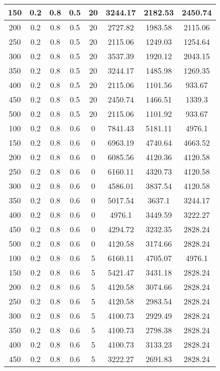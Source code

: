 \documentclass[a4paper, 12pt]{extreport}
\begin{document}
\begin{itemize}
\begin{longtable}{|c|c|c|c|c|c|c|c|}
			150 & 0.2 & 0.8 & 0.5 & 20 & 3244.17 & 2182.53 & 2450.74 \\\hline
			200 & 0.2 & 0.8 & 0.5 & 20 & 2727.82 & 1983.58 & 2115.06 \\\hline
			250 & 0.2 & 0.8 & 0.5 & 20 & 2115.06 & 1249.03 & 1254.64 \\\hline
			300 & 0.2 & 0.8 & 0.5 & 20 & 3537.39 & 1920.12 & 2043.15 \\\hline
			350 & 0.2 & 0.8 & 0.5 & 20 & 3244.17 & 1485.98 & 1269.35 \\\hline
			400 & 0.2 & 0.8 & 0.5 & 20 & 2115.06 & 1101.56 & 933.67 \\\hline
			450 & 0.2 & 0.8 & 0.5 & 20 & 2450.74 & 1466.51 & 1339.3 \\\hline
			500 & 0.2 & 0.8 & 0.5 & 20 & 2115.06 & 1101.92 & 933.67 \\\hline
			100 & 0.2 & 0.8 & 0.6 & 0 & 7841.43 & 5181.11 & 4976.1 \\\hline
			150 & 0.2 & 0.8 & 0.6 & 0 & 6963.19 & 4740.64 & 4663.52 \\\hline
			200 & 0.2 & 0.8 & 0.6 & 0 & 6085.56 & 4120.36 & 4120.58 \\\hline
			250 & 0.2 & 0.8 & 0.6 & 0 & 6160.11 & 4320.73 & 4120.58 \\\hline
			300 & 0.2 & 0.8 & 0.6 & 0 & 4586.01 & 3837.54 & 4120.58 \\\hline
			350 & 0.2 & 0.8 & 0.6 & 0 & 5017.54 & 3637.1 & 3244.17 \\\hline
			400 & 0.2 & 0.8 & 0.6 & 0 & 4976.1 & 3449.59 & 3222.27 \\\hline
			450 & 0.2 & 0.8 & 0.6 & 0 & 4294.72 & 3232.35 & 2828.24 \\\hline
			500 & 0.2 & 0.8 & 0.6 & 0 & 4120.58 & 3174.66 & 2828.24 \\\hline
			100 & 0.2 & 0.8 & 0.6 & 5 & 6160.11 & 4705.07 & 4976.1 \\\hline
			150 & 0.2 & 0.8 & 0.6 & 5 & 5421.47 & 3431.18 & 2828.24 \\\hline
			200 & 0.2 & 0.8 & 0.6 & 5 & 4120.58 & 3074.66 & 2828.24 \\\hline
			250 & 0.2 & 0.8 & 0.6 & 5 & 4120.58 & 2983.54 & 2828.24 \\\hline
			300 & 0.2 & 0.8 & 0.6 & 5 & 4100.73 & 2929.49 & 2828.24 \\\hline
			350 & 0.2 & 0.8 & 0.6 & 5 & 4100.73 & 2798.38 & 2828.24 \\\hline
			400 & 0.2 & 0.8 & 0.6 & 5 & 4100.73 & 3133.23 & 2828.24 \\\hline
			450 & 0.2 & 0.8 & 0.6 & 5 & 3222.27 & 2691.83 & 2828.24 \\\hline

\end{longtable}
\end{itemize}
\end{document}
